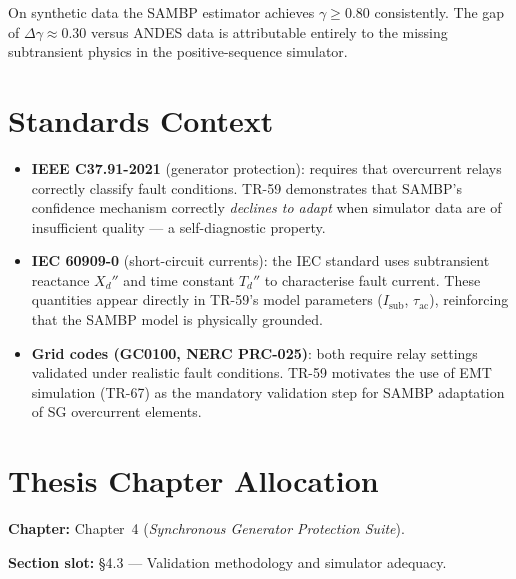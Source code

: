 \documentclass[11pt,a4paper]{article}
\newcommand{\Isub}{I_{\text{sub}}}
\newcommand{\tauac}{\tau_{\text{ac}}}
\newcommand{\gconf}{\gamma}
\begin{document}
On synthetic data the SAMBP estimator achieves $\gconf \geq 0.80$
consistently.  The gap of $\Delta\gconf \approx 0.30$ versus ANDES data
is attributable entirely to the missing subtransient physics in the
positive-sequence simulator.

\section{Standards Context}
\label{sec:standards}

\begin{itemize}
  \item \textbf{IEEE C37.91-2021} (generator protection): requires that
        overcurrent relays correctly classify fault conditions.
        TR-59 demonstrates that SAMBP's confidence mechanism correctly
        \emph{declines to adapt} when simulator data are of insufficient
        quality — a self-diagnostic property.

  \item \textbf{IEC 60909-0} (short-circuit currents): the IEC standard
        uses subtransient reactance $X_d''$ and time constant $T_d''$ to
        characterise fault current.  These quantities appear directly in
        TR-59's model parameters ($\Isub$, $\tauac$), reinforcing that
        the SAMBP model is physically grounded.

  \item \textbf{Grid codes (GC0100, NERC PRC-025)}: both require relay
        settings validated under realistic fault conditions.  TR-59
        motivates the use of EMT simulation (TR-67) as the mandatory
        validation step for SAMBP adaptation of SG overcurrent elements.
\end{itemize}

\section{Thesis Chapter Allocation}
\label{sec:thesis}

\textbf{Chapter:} Chapter~4 (\textit{Synchronous Generator Protection Suite}).

\textbf{Section slot:} \S4.3 — Validation methodology and simulator adequacy.
\end{document}
